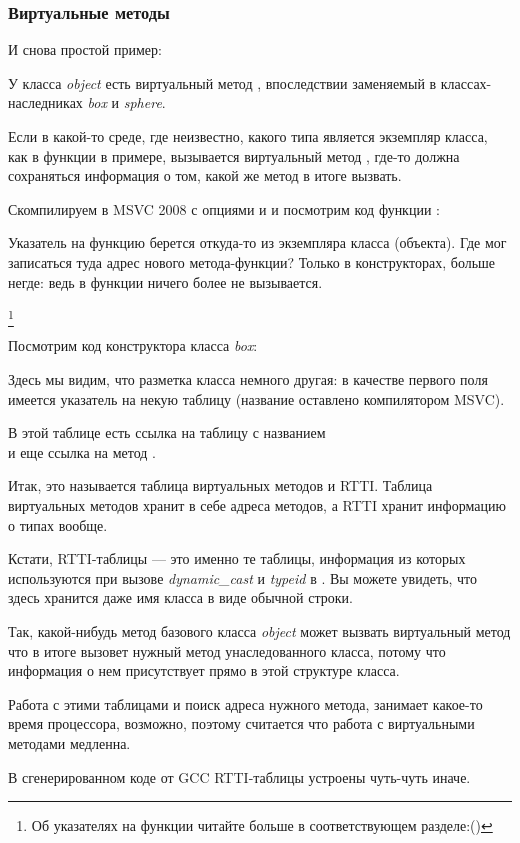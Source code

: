 \subsubsection{Виртуальные методы}

И снова простой пример:



У класса \emph{object} есть виртуальный метод , 
впоследствии заменяемый в классах-наследниках \emph{box} и \emph{sphere}.


Если в какой-то среде, где неизвестно, какого типа является экземпляр класса, как в функции \main в примере, 
вызывается виртуальный метод , где-то должна сохраняться информация о том, какой же метод в итоге 
вызвать.


Скомпилируем в MSVC 2008 с опциями \Ox и \Obzero и посмотрим код функции \main:




Указатель на функцию  берется откуда-то из экземпляра класса (объекта). 
Где мог записаться туда адрес нового метода-функции?
Только в конструкторах, больше негде: ведь в функции \main ничего более не вызывается.

\footnote{Об указателях на функции читайте больше в соответствующем разделе:()}

Посмотрим код конструктора класса \emph{box}:




Здесь мы видим, что разметка класса немного другая: в качестве первого поля имеется указатель 
на некую таблицу  (название оставлено компилятором MSVC).


\label{RTTI}
В этой таблице есть ссылка на таблицу с названием \\
 и еще ссылка на 
метод .

Итак, это называется таблица виртуальных методов и \ac{RTTI}.
Таблица виртуальных методов хранит в себе адреса методов, а \ac{RTTI} хранит информацию о типах вообще.

Кстати, \ac{RTTI}-таблицы --- это именно те таблицы, информация из которых используются при вызове \emph{dynamic\_cast} и \emph{typeid} в \Cpp. 
Вы можете увидеть, что здесь хранится даже имя класса в виде обычной строки.

Так, какой-нибудь метод базового класса \emph{object} может вызвать виртуальный метод  что 
в итоге вызовет нужный метод унаследованного класса, потому что информация о нем присутствует прямо в этой 
структуре класса.


Работа с этими таблицами и поиск адреса нужного метода, занимает какое-то время процессора, возможно, 
поэтому считается что работа с виртуальными методами медленна.


В сгенерированном коде от GCC \ac{RTTI}-таблицы устроены чуть-чуть иначе.

